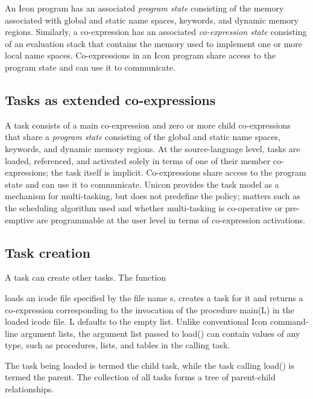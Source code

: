 An Icon program has an associated \textit{program state} consisting of
the memory associated with global and static name spaces, keywords, and
dynamic memory regions. Similarly, a co-expression has an associated
\textit{co-expression state} consisting of an evaluation stack that
contains the memory used to implement one or more local name spaces.
Co-expressions in an Icon program share access to the program state and
can use it to communicate. 

\subsection*{Tasks as extended co-expressions}

A task consists of a main co-expression and zero or more child
co-expressions that share a {\em program state\/} 
consisting of the global and static name
spaces, keywords, and dynamic memory regions. At the source-language
level, tasks are loaded, referenced, and activated solely in terms of
one of their member co-expressions; the task itself is implicit.
Co-expressions share access to the program state and can use it to
communicate.
Unicon provides the task model as a mechanism for multi-tasking, but does
not predefine the policy; matters such as the scheduling algorithm used and
whether multi-tasking is co-operative or pre-emptive are programmable at the
user level in terms of co-expression activations.


\subsection*{Task creation}

A task can create other tasks. The function 


\noindent loads an icode file \cite{Gris86} specified by the file name
\textrm{s}, creates a task for it and returns a co-expression corresponding to
the invocation of the procedure {\textrm{main(L)}} in the
loaded icode file.  {\textrm{L}}{
}defaults to the empty list. Unlike conventional Icon command-line argument
lists, the argument list passed to{
}{\textrm{load()}} can contain values of any type, such as
procedures, lists, and tables in the calling task.

The task being loaded is termed the child task, while the task calling
{\textrm{load()}} is termed the parent. The
collection of all tasks forms a tree of parent-child
relationships.

